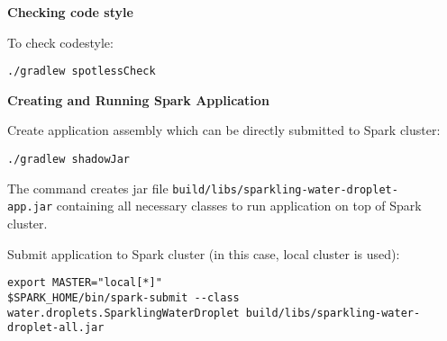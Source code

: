 \textbf{Checking code style}

To check codestyle:

\begin{lstlisting}[style=Bash]
./gradlew spotlessCheck
\end{lstlisting}

\textbf{Creating and Running Spark Application}

Create application assembly which can be directly submitted to Spark cluster:

\begin{lstlisting}[style=Bash]
./gradlew shadowJar
\end{lstlisting}

The command creates jar file \texttt{build/libs/sparkling-water-droplet-}\\
\texttt{app.jar} containing all necessary classes to run application on top of Spark cluster.

Submit application to Spark cluster (in this case, local cluster is used):

\begin{lstlisting}[style=Bash]
export MASTER="local[*]"
$SPARK_HOME/bin/spark-submit --class water.droplets.SparklingWaterDroplet build/libs/sparkling-water-droplet-all.jar
\end{lstlisting}


